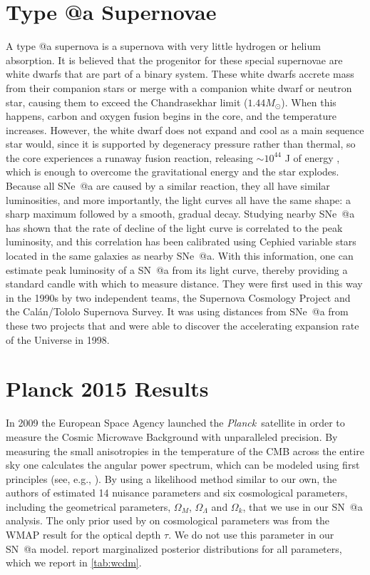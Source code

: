 \documentclass[12pt,a4paper]{article}
\makeatletter
\newcommand\Planck{{\it Planck}\ }
\newcommand*{\rom}[1]{\expandafter\@slowromancap\romannumeral #1@}
\newcommand{\sna}{\mbox{SN \rom{1}a}}
\newcommand{\snea}{\mbox{SNe \rom{1}a}}
\makeatother
\begin{document}
\section{Type \rom{1}a Supernovae}
\label{sec:SNIa}
A type \rom{1}a supernova is a supernova with very little hydrogen or
helium absorption. It is believed that the progenitor for these special
supernovae are white dwarfs that are part of a binary system. These white
dwarfs accrete mass from their companion stars or merge with a companion white
dwarf or neutron star, causing them to exceed the Chandrasekhar limit
($1.44 M_\odot$). When this happens, carbon and oxygen fusion begins in the
core, and the temperature increases. However, the white dwarf does not expand
and cool as a main sequence star would, since it is supported by degeneracy
pressure rather than thermal, so the core experiences a runaway fusion
reaction, releasing $\sim 10^{44}$ J of energy \citep[see, e.g.,][chap. 18.4]{ryden2010}, 
which is enough to overcome the gravitational energy and the star explodes. Because all 
\snea{} are caused by a similar reaction, they all have similar luminosities, and more 
importantly, the light curves all have the same shape: a sharp maximum followed by a smooth, 
gradual decay. Studying nearby \snea{} has shown that the rate of decline of the light curve 
is correlated to the peak luminosity, and this correlation has been calibrated using Cephied 
variable stars located in the same galaxies as nearby \snea{}. With this information, one can 
estimate peak luminosity of a \sna{} from its light curve, thereby providing a 
standard candle with which to measure distance. They were first used in this way in the 
1990s by two independent teams, the Supernova Cosmology Project and the Cal\'{a}n/Tololo 
Supernova Survey. It was using distances from \snea{} from these two projects that 
\citet{riess1998} and \citet{perlmutter1999} were able to discover the accelerating expansion 
rate of the Universe in 1998. 

\section{Planck 2015 Results}
\label{sec:planck}
In 2009 the European Space Agency launched the \Planck satellite in order
to measure the Cosmic Microwave Background with unparalleled precision.
By measuring the small anisotropies in the temperature of the CMB across
the entire sky one calculates the angular power spectrum, which can be
modeled using first principles (see, e.g., \citet{dodelson2003}).
By using a likelihood method similar to our own, the authors of
\citet{planck2013} estimated 14 nuisance parameters and 
six cosmological parameters, including the geometrical parameters,
$\Omega_M$, $\Omega_\Lambda$ and $\Omega_k$, that we use in our
{\sna} analysis. The only prior used by \citet{planck2013}
on cosmological parameters was from the WMAP result \citep{wmap2011}
for the optical depth $\tau$. We do not use this parameter
in our {\sna} model. \citet{planck2013} report marginalized
posterior distributions for all parameters,
which we report in \autoref{tab:wcdm}.
\end{document}

